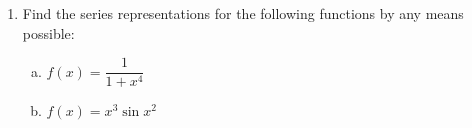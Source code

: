 \begin{enumerate}
\item  Find the series representations for the following functions by any means possible:

\begin{enumerate}[(a)]

\item \(f(x) = \dfrac{1}{1+x^4}\)

\vspace*{1.5in}

%
%
%

\item \(f(x) = x^3 \sin x^2\)

\vspace*{1.5in}



\end{enumerate}



%
%


\end{enumerate}

